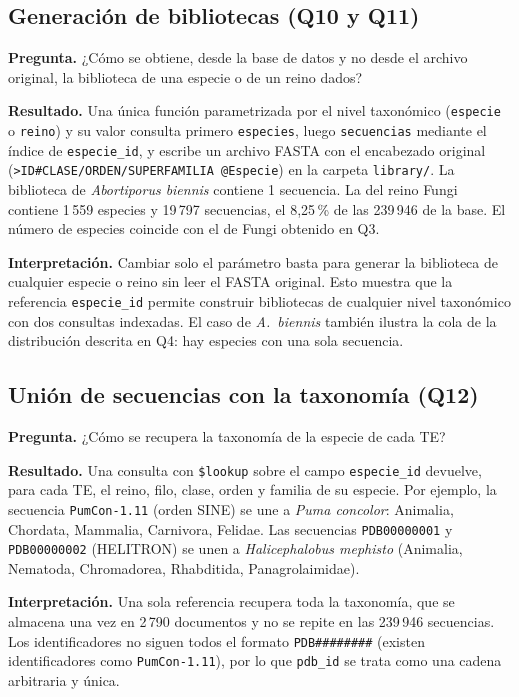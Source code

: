 \subsection{Generación de bibliotecas (Q10 y Q11)}
 
\textbf{Pregunta.} ¿Cómo se obtiene, desde la base de datos y no desde el
archivo original, la biblioteca de una especie o de un reino dados?
 
\textbf{Resultado.} Una única función parametrizada por el nivel
taxonómico (\texttt{especie} o \texttt{reino}) y su valor consulta
primero \texttt{especies}, luego \texttt{secuencias} mediante el índice
de \texttt{especie\_id}, y escribe un archivo FASTA con el encabezado
original (\texttt{>ID\#CLASE/ORDEN/SUPERFAMILIA @Especie}) en la carpeta
\texttt{library/}. La biblioteca de \textit{Abortiporus biennis}
contiene 1 secuencia. La del reino Fungi contiene 1\,559 especies y
19\,797 secuencias, el 8{,}25\,\% de las 239\,946 de la base. El número
de especies coincide con el de Fungi obtenido en Q3.
 
\textbf{Interpretación.} Cambiar solo el parámetro basta para generar la
biblioteca de cualquier especie o reino sin leer el FASTA original. Esto
muestra que la referencia \texttt{especie\_id} permite construir
bibliotecas de cualquier nivel taxonómico con dos consultas indexadas.
El caso de \textit{A.\ biennis} también ilustra la cola de la
distribución descrita en Q4: hay especies con una sola secuencia.
 
\subsection{Unión de secuencias con la taxonomía (Q12)}
 
\textbf{Pregunta.} ¿Cómo se recupera la taxonomía de la especie de cada TE?
 
\textbf{Resultado.} Una consulta con \texttt{\$lookup} sobre el campo
\texttt{especie\_id} devuelve, para cada TE, el reino, filo, clase, orden
y familia de su especie. Por ejemplo, la secuencia \texttt{PumCon-1.11}
(orden SINE) se une a \textit{Puma concolor}: Animalia, Chordata,
Mammalia, Carnivora, Felidae. Las secuencias \texttt{PDB00000001} y
\texttt{PDB00000002} (HELITRON) se unen a \textit{Halicephalobus
mephisto} (Animalia, Nematoda, Chromadorea, Rhabditida,
Panagrolaimidae).
 
\textbf{Interpretación.} Una sola referencia recupera toda la taxonomía,
que se almacena una vez en 2\,790 documentos y no se repite en las
239\,946 secuencias. Los identificadores no siguen todos el formato
\texttt{PDB\#\#\#\#\#\#\#\#} (existen identificadores como
\texttt{PumCon-1.11}), por lo que \texttt{pdb\_id} se trata como una
cadena arbitraria y única.
 
